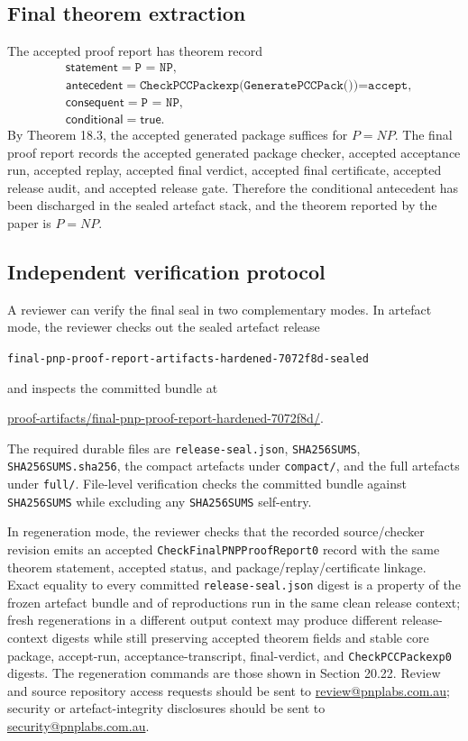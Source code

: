 \documentclass[10.5pt,a4paper]{article}
\begin{document}
\subsection{Final theorem extraction}
The accepted proof report has theorem record
\[
\begin{aligned}
&\mathsf{statement}=\texttt{P = NP},\\
&\mathsf{antecedent}=\texttt{CheckPCCPackexp(GeneratePCCPack())=accept},\\
&\mathsf{consequent}=\texttt{P = NP},\\
&\mathsf{conditional}=\mathsf{true}.
\end{aligned}
\]
By Theorem 18.3, the accepted generated package suffices for \(P=NP\).  The final proof report records the accepted generated package checker, accepted acceptance run, accepted replay, accepted final verdict, accepted final certificate, accepted release audit, and accepted release gate.  Therefore the conditional antecedent has been discharged in the sealed artefact stack, and the theorem reported by the paper is \(P=NP\).

\subsection{Independent verification protocol}
A reviewer can verify the final seal in two complementary modes.  In artefact mode, the reviewer checks out the sealed artefact release
\begin{center}
\texttt{final-pnp-proof-report-artifacts-hardened-7072f8d-sealed}
\end{center}
and inspects the committed bundle at
\begin{center}
\url{proof-artifacts/final-pnp-proof-report-hardened-7072f8d/}.
\end{center}
The required durable files are \texttt{release-seal.json}, \texttt{SHA256SUMS}, \texttt{SHA256SUMS.sha256}, the compact artefacts under \texttt{compact/}, and the full artefacts under \texttt{full/}.  File-level verification checks the committed bundle against \texttt{SHA256SUMS} while excluding any \texttt{SHA256SUMS} self-entry.

In regeneration mode, the reviewer checks that the recorded source/checker revision emits an accepted \texttt{CheckFinalPNPProofReport0} record with the same theorem statement, accepted status, and package/replay/certificate linkage.  Exact equality to every committed \texttt{release-seal.json} digest is a property of the frozen artefact bundle and of reproductions run in the same clean release context; fresh regenerations in a different output context may produce different release-context digests while still preserving accepted theorem fields and stable core package, accept-run, acceptance-transcript, final-verdict, and \texttt{CheckPCCPackexp0} digests.  The regeneration commands are those shown in Section 20.22.  Review and source repository access requests should be sent to \href{mailto:review@pnplabs.com.au}{review@pnplabs.com.au}; security or artefact-integrity disclosures should be sent to \href{mailto:security@pnplabs.com.au}{security@pnplabs.com.au}.
\end{document}
